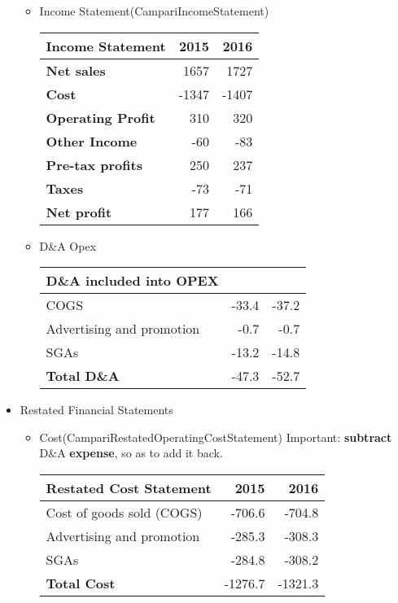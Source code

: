 \documentclass[11pt]{article}
\begin{document}
\begin{itemize}
\begin{itemize}
\item Income Statement(CampariIncomeStatement)
\label{sec:orgd92a075}
\begin{table}[htbp]
\label{CampariIncomeStatement}
\centering
\begin{tabular}{lrr}
\textbf{Income Statement} & 2015 & 2016\\
\hline
\textbf{Net sales} & 1657 & 1727\\
\hline
\textbf{Cost} & -1347 & -1407\\
\hline
\textbf{Operating Profit} & 310 & 320\\
\hline
\textbf{Other Income} & -60 & -83\\
\hline
\textbf{Pre-tax profits} & 250 & 237\\
\hline
\textbf{Taxes} & -73 & -71\\
\hline
\textbf{Net profit} & 177 & 166\\
\hline
\end{tabular}
\end{table}

\item D\&A Opex
\label{sec:orgeb5164f}
\begin{table}[htbp]
\label{CampariDAOpex}
\centering
\begin{tabular}{lrr}
\textbf{D\&A included into OPEX} &  & \\
\hline
COGS & -33.4 & -37.2\\
Advertising and promotion & -0.7 & -0.7\\
SGAs & -13.2 & -14.8\\
\hline
\textbf{Total D\&A} & -47.3 & -52.7\\
\end{tabular}
\end{table}
\end{itemize}

\item Restated Financial Statements
\label{sec:org8bf39d9}
\begin{itemize}
\item Cost(CampariRestatedOperatingCostStatement)
\label{sec:org6ddddf1}
Important: \textbf{subtract} D\&A \textbf{expense}, so as to add it back.\\
\begin{table}[htbp]
\label{CampariRestatedOperatingCostStatement}
\centering
\begin{tabular}{lrr}
\textbf{Restated Cost Statement} & 2015 & 2016\\
\hline
Cost of goods sold (COGS) & -706.6 & -704.8\\
Advertising and promotion & -285.3 & -308.3\\
SGAs & -284.8 & -308.2\\
\hline
\textbf{Total Cost} & -1276.7 & -1321.3\\
\end{tabular}
\end{table}


\end{itemize}
\end{itemize}
\end{document}
